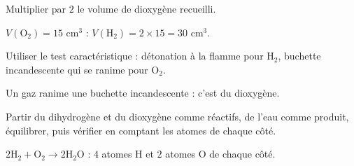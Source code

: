 Multiplier par $2$ le volume de dioxygène recueilli.
\begin{exemple}
$V(\mathrm{O_2})=15$ cm$^{3}$ : $V(\mathrm{H_2})=2\times15=30$ cm$^{3}$.
\end{exemple}

Utiliser le test caractéristique : détonation à la flamme pour $\mathrm{H_2}$, buchette
incandescente qui se ranime pour $\mathrm{O_2}$.
\begin{exemple}
Un gaz ranime une buchette incandescente : c'est du dioxygène.
\end{exemple}

Partir du dihydrogène et du dioxygène comme réactifs, de l'eau comme produit, équilibrer,
puis vérifier en comptant les atomes de chaque côté.
\begin{exemple}
$2\mathrm{H_2}+\mathrm{O_2}\to2\mathrm{H_2O}$ : $4$ atomes H et $2$ atomes O de chaque
côté.
\end{exemple}

